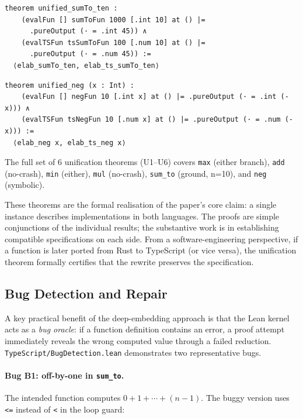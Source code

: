 \begin{lstlisting}[caption={U5: sum\_to — same spec from Rust loop and TypeScript while loop.},
                   label={lst:unifiedsumto}]
theorem unified_sumTo_ten :
    (evalFun [] sumToFun 1000 [.int 10] at () |=
      .pureOutput (· = .int 45)) ∧
    (evalTSFun tsSumToFun 100 [.num 10] at () |=
      .pureOutput (· = .num 45)) :=
  ⟨elab_sumTo_ten, elab_ts_sumTo_ten⟩
\end{lstlisting}

\begin{lstlisting}[caption={U6: neg — symbolic unification.},label={lst:unifiedneg}]
theorem unified_neg (x : Int) :
    (evalFun [] negFun 10 [.int x] at () |= .pureOutput (· = .int (-x))) ∧
    (evalTSFun tsNegFun 10 [.num x] at () |= .pureOutput (· = .num (-x))) :=
  ⟨elab_neg x, elab_ts_neg x⟩
\end{lstlisting}

\noindent
The full set of 6 unification theorems (U1--U6) covers
\texttt{max} (either branch), \texttt{add} (no-crash), \texttt{min} (either),
\texttt{mul} (no-crash), \texttt{sum\_to} (ground, n=10), and \texttt{neg} (symbolic).

These theorems are the formal realisation of the paper's core claim:
a single \ProgramSpec instance describes implementations in both languages.
The proofs are simple conjunctions of the individual results; the substantive
work is in establishing compatible specifications on each side.
From a software-engineering perspective, if a function is later ported from
Rust to TypeScript (or vice versa), the unification theorem formally certifies
that the rewrite preserves the specification.

\subsection{Bug Detection and Repair}
\label{sec:ts-bug-detection}

A key practical benefit of the deep-embedding approach is that the Lean kernel
acts as a \emph{bug oracle}: if a function definition contains an error, a proof
attempt immediately reveals the wrong computed value through a failed \rfl reduction.
\texttt{TypeScript/BugDetection.lean} demonstrates two representative bugs.

\paragraph{Bug B1: off-by-one in \texttt{sum\_to}.}
The intended function computes $0 + 1 + \cdots + (n-1)$.
The buggy version uses \texttt{<=} instead of \texttt{<} in the loop guard:

